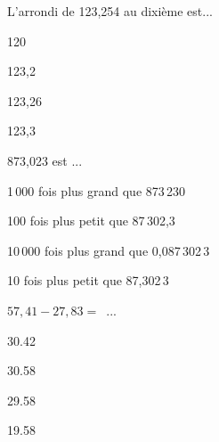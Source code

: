 \begin{QCM}
\begin{GroupeQCM}
     \begin{exercice}
      L'arrondi de 123,254 au dixième est...
      \begin{ChoixQCM}{4}
      \item 120
      \item 123,2
      \item 123,26
      \item 123,3
      \end{ChoixQCM}
      \begin{corrige}
   \end{corrige}
    \end{exercice}

     \begin{exercice}
      873,023 est ...
      \begin{ChoixQCM}{4}
      \item 1\,000 fois plus grand que 873\,230
      \item 100 fois plus petit que 87\,302,3
      \item 10\,000 fois plus grand que 0,087\,302\,3
      \item 10 fois plus petit que 87,302\,3
      \end{ChoixQCM}
      \begin{corrige}
   \end{corrige}
    \end{exercice}
    
     \begin{exercice}
      $57,41 - 27,83 =$ ...
      \begin{ChoixQCM}{4}
      \item 30.42
      \item 30.58
      \item 29.58
      \item 19.58
      \end{ChoixQCM}
      \begin{corrige}
   \end{corrige}
    \end{exercice}
 \end{GroupeQCM}  
 \end{QCM}  
    
    
    
    
    
